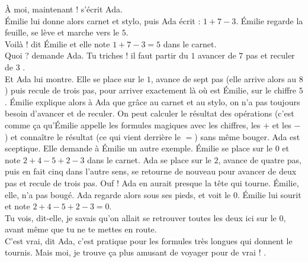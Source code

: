 \guillemotleft À moi, maintenant ! s’écrit Ada. \guillemotright \\
Émilie lui donne alors carnet et stylo, puis Ada écrit : $1 + 7 - 3 $. Émilie regarde la feuille, se lève et marche vers le $5$.\\
\guillemotleft Voilà ! dit Émilie et elle note $1 + 7 - 3 = 5$ dans le carnet.\\
\mdash Quoi ? demande Ada. Tu triches ! il faut partir du $1$ avancer de $7$ pas et reculer de $3$ \guillemotright.\\
Et Ada lui montre. Elle se place sur le $1$, avance de sept pas (elle arrive alors au $8$) puis recule de trois pas, pour arriver exactement là où est Émilie, sur le chiffre $5$. Émilie explique alors à Ada que grâce au carnet et au stylo, on n’a pas toujours besoin d’avancer et de reculer. On peut calculer le résultat des opérations (c’est comme ça qu’Émilie appelle les formules magiques avec les chiffres, les $+$ et les $-$) et connaître le résultat (ce qui vient derrière le $=$) sans même bouger. Ada est sceptique. Elle demande à Émilie un autre exemple. Émilie se place sur le $0$ et note $2 + 4 - 5 + 2 - 3$ dans le carnet. Ada se place sur le $2$, avance de quatre pas, puis en fait cinq dans l’autre sens, se retourne de nouveau pour avancer de deux pas et recule de trois pas. Ouf ! Ada en aurait presque la tête qui tourne. Émilie, elle, n’a pas bougé. Ada regarde alors sous ses pieds, et voit le $0$. Émilie lui sourit et note $2 + 4 - 5 + 2 - 3 = 0$.\\
\guillemotleft Tu vois, dit-elle, je savais qu’on allait se retrouver toutes les deux ici sur le 0, avant même que tu ne te mettes en route.\\
\mdash C’est vrai, dit Ada, c’est pratique pour les formules très longues qui donnent le tournis. Mais moi, je trouve ça plus amusant de voyager pour de vrai ! \guillemotright.

%    
